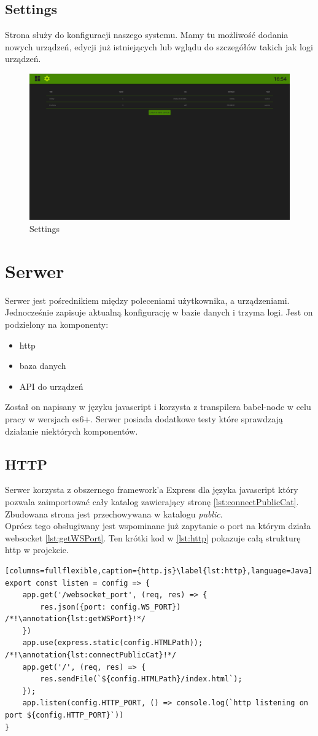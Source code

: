 \subsection{Settings}
Strona służy do konfiguracji naszego systemu. Mamy tu możliwość dodania nowych urządzeń, edycji już istniejących lub wglądu do szczegółów takich jak logi urządzeń.
\begin{figure}[h!]
  \includegraphics[width=\linewidth]{settings.png}
  \caption{Settings}
  \label{fig:settings}
\end{figure}
\newpage
\section{Serwer}
Serwer jest pośrednikiem między poleceniami użytkownika, a urządzeniami. Jednocześnie zapisuje aktualną konfigurację w bazie danych i trzyma logi. Jest on podzielony na komponenty:
\begin{itemize}
    \item http
    \item baza danych
    \item API do urządzeń
\end{itemize}
Został on napisany w języku javascript i korzysta z transpilera babel-node w celu pracy w wersjach es6+. Serwer posiada dodatkowe testy które sprawdzają działanie niektórych komponentów.
\subsection{HTTP}
Serwer korzysta z obszernego framework'a Express dla języka javascript który pozwala zaimportować cały katalog zawierający stronę \ref{lst:connectPublicCat}. Zbudowana strona jest przechowywana w katalogu \textit{public}. \\
Oprócz tego obsługiwany jest wspominane już zapytanie o port na którym działa websocket \ref{lst:getWSPort}.
Ten krótki kod w \ref{lst:http} pokazuje całą strukturę http w projekcie.
\begin{lstlisting}[columns=fullflexible,caption={http.js}\label{lst:http},language=Java]
export const listen = config => {
    app.get('/websocket_port', (req, res) => {
        res.json({port: config.WS_PORT}) /*!\annotation{lst:getWSPort}!*/
    })
    app.use(express.static(config.HTMLPath)); /*!\annotation{lst:connectPublicCat}!*/
    app.get('/', (req, res) => {
        res.sendFile(`${config.HTMLPath}/index.html`);
    });
    app.listen(config.HTTP_PORT, () => console.log(`http listening on port ${config.HTTP_PORT}`))
}
\end{lstlisting}
